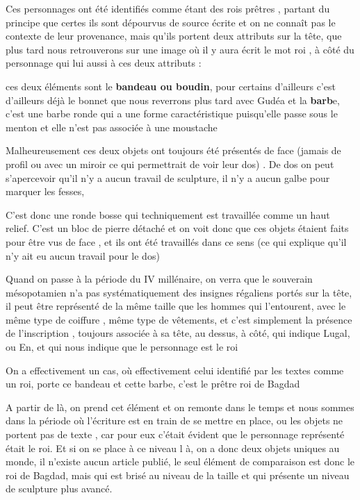 \documentclass[a4paper,10pt]{article}
\begin{document}
\begin{itemize}
Ces personnages ont été identifiés comme étant des rois prêtres ,
partant du principe que certes ils sont dépourvus de source écrite et
on ne connaît pas le contexte de leur provenance, mais
qu'ils portent deux attributs sur la tête, que plus
tard nous retrouverons sur une image où il y aura écrit le mot roi , à
côté du personnage qui lui aussi à ces deux attributs : 

ces deux éléments sont le \textbf{bandeau ou boudin}, pour certains
d'ailleurs c'est
d'ailleurs déjà le bonnet que nous reverrons plus tard
avec Gudéa et la \textbf{barb}e, c'est une barbe ronde
qui a une forme caractéristique puisqu'elle passe sous
le menton et elle n'est pas associée à une moustache

Malheureusement ces deux objets ont toujours été présentés de face
(jamais de profil ou avec un miroir ce qui permettrait de voir leur
dos) . De dos on peut s'apercevoir
qu'il n'y a aucun travail de
sculpture, il n'y a aucun galbe pour marquer les
fesses, 

C'est donc une ronde bosse qui techniquement est
travaillée comme un haut relief. C'est un bloc de
pierre détaché et on voit donc que ces objets étaient faits pour être
vus de face , et ils ont été travaillés dans ce sens (ce qui explique
qu'il n'y ait eu aucun travail pour
le dos)

Quand on passe à la période du IV millénaire, on verra que le souverain
mésopotamien n'a pas systématiquement des insignes
régaliens portés sur la tête, il peut être représenté de la même taille
que les hommes qui l'entourent, avec le même type de
coiffure , même type de vêtements, et c'est simplement
la présence de l'inscription , toujours associée à sa
tête, au dessus, à côté, qui indique Lugal, ou En, et qui nous indique
que le personnage est le roi

On a effectivement un cas, où effectivement celui identifié par les
textes comme un roi, porte ce bandeau et cette barbe,
c'est le prêtre roi de Bagdad

A partir de là, on prend cet élément et on remonte dans le temps et nous
sommes dans la période où l'écriture est en train de
se mettre en place, ou les objets ne portent pas de texte , car pour
eux c'était évident que le personnage représenté était
le roi. Et si on se place à ce niveau l à, on a donc deux objets
uniques au monde, il n'existe aucun article publié, le
seul élément de comparaison est donc le roi de Bagdad, mais qui est
brisé au niveau de la taille et qui présente un niveau de sculpture
plus avancé.


\end{itemize}
\end{document}
